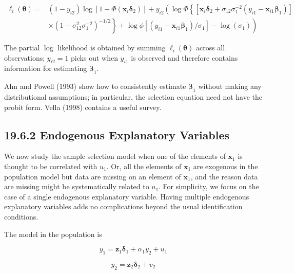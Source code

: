 \documentclass[10pt]{article}
\begin{document}
$$
\begin{aligned}
\ell_{i}(\boldsymbol{\theta})= & \left(1-y_{i 2}\right) \log \left[1-\Phi\left(\mathbf{x}_{i} \boldsymbol{\delta}_{2}\right)\right]+y_{i 2}\left(\operatorname { l o g } \Phi \left\{\left[\mathbf{x}_{i} \boldsymbol{\delta}_{2}+\sigma_{12} \sigma_{1}^{-2}\left(y_{i 1}-\mathbf{x}_{i 1} \boldsymbol{\beta}_{1}\right)\right]\right.\right. \\
& \left.\left.\times\left(1-\sigma_{12}^{2} \sigma_{1}^{-2}\right)^{-1 / 2}\right\}+\log \phi\left[\left(y_{i 1}-\mathbf{x}_{i 1} \boldsymbol{\beta}_{1}\right) / \sigma_{1}\right]-\log \left(\sigma_{1}\right)\right)
\end{aligned}
$$

The partial $\log$ likelihood is obtained by summing $\ell_{i}(\boldsymbol{\theta})$ across all observations; $y_{i 2}=1$ picks out when $y_{i 1}$ is observed and therefore contains information for estimating $\boldsymbol{\beta}_{1}$.

Ahn and Powell (1993) show how to consistently estimate $\boldsymbol{\beta}_{1}$ without making any distributional assumptions; in particular, the selection equation need not have the probit form. Vella (1998) contains a useful survey.

\subsection*{19.6.2 Endogenous Explanatory Variables}
We now study the sample selection model when one of the elements of $\mathbf{x}_{1}$ is thought to be correlated with $u_{1}$. Or, all the elements of $\mathbf{x}_{1}$ are exogenous in the population model but data are missing on an element of $\mathbf{x}_{1}$, and the reason data are missing might be systematically related to $u_{1}$. For simplicity, we focus on the case of a single endogenous explanatory variable. Having multiple endogenous explanatory variables adds no complications beyond the usual identification conditions.

The model in the population is


\begin{equation*}
y_{1}=\mathbf{z}_{1} \boldsymbol{\delta}_{1}+\alpha_{1} y_{2}+u_{1} \tag{19.56}
\end{equation*}



\begin{equation*}
y_{2}=\mathbf{z}_{2} \boldsymbol{\delta}_{2}+v_{2} \tag{19.57}
\end{equation*}
\end{document}

